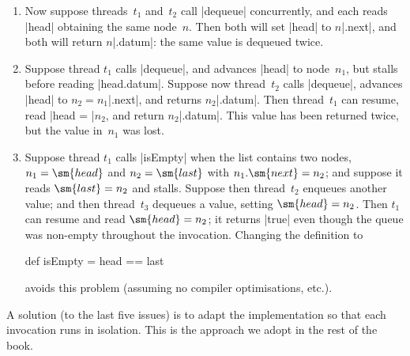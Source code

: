 \begin{answerI}
\begin{enumerate}

\item Now suppose threads~$t_1$ and~$t_2$ call |dequeue| concurrently, and
  each reads |head| obtaining the same node~$n$.  Then both will set |head| to
  $n$|.next|, and both will return $n$|.datum|: the same value is dequeued
  twice.


\item Suppose thread $t_1$ calls |dequeue|, and advances |head| to node~$n_1$,
  but stalls before reading |head.datum|.  Suppose now thread~$t_2$ calls
  |dequeue|, advances |head| to $n_2 = n_1$|.next|, and returns $n_2$|.datum|.
  Then thread~$t_1$ can resume, read |head = |$n_2$, and
  return $n_2$|.datum|.  This value has been returned twice, but the value
  in~$n_1$ was lost. 

\item Suppose thread $t_1$ calls |isEmpty| when the list contains two nodes,
  $n_1 = \sm{head}$ and $n_2 = \sm{last}$ with $n_1.\sm{next} = n_2$; and
  suppose it reads $\sm{last} = n_2$ and stalls.  Suppose then thread~$t_2$
  enqueues another value; and then thread~$t_3$ dequeues a value, setting
  $\sm{head} = n_2$.  Then $t_1$ can resume and read $\sm{head} = n_2$; it
  returns |true| even though the queue was non-empty throughout the
  invocation. 
%
  Changing the definition to
  \begin{scala}
  def isEmpty = head == last
  \end{scala}%
  avoids this problem (assuming no compiler optimisations, etc.).
\end{enumerate}

A solution (to the last five issues) is to adapt the implementation so that
each invocation runs in isolation.  This is the approach we adopt in the rest
of the book.
\end{answerI}
